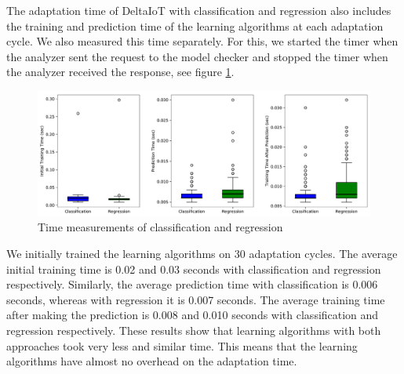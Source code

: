 \documentclass[a4paper,12pt]{article}
\begin{document}
The adaptation time of DeltaIoT with classification and regression also includes the training and prediction time of the learning algorithms at each adaptation cycle. We also measured this time separately. For this, we started the timer when the analyzer sent the request to the model checker and stopped the timer when the analyzer received the response, see figure \ref{TimeMeasurement}.
\begin{figure}[H]
	\centering
	\includegraphics[keepaspectratio, width=\linewidth]{graphs/TimeMeasurement.pdf}
	\caption{Time measurements of classification and regression}
	\label{TimeMeasurement}
\end{figure}
We initially trained the learning algorithms on 30 adaptation cycles. The average initial training time is 0.02 and 0.03 seconds with classification and regression respectively. Similarly, the average prediction time with classification is 0.006 seconds, whereas with regression it is 0.007 seconds. The average training time after making the prediction is 0.008 and 0.010 seconds with classification and regression respectively. These results show that learning algorithms with both approaches took very less and similar time. This means that the learning algorithms have almost no overhead on the adaptation time.
\end{document}
